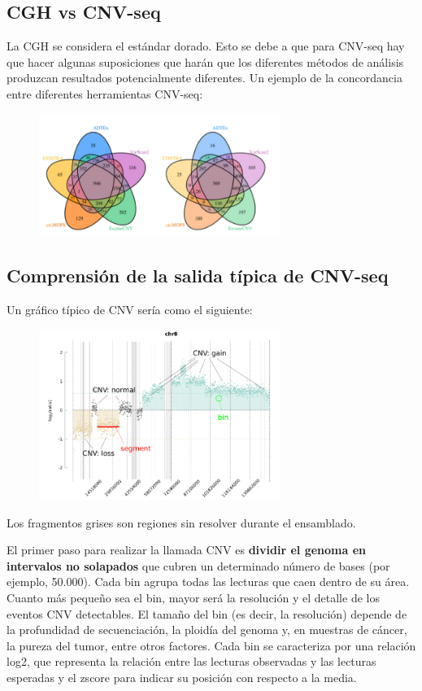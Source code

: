\begin{itemize}
\subsection{CGH vs CNV-seq}
La CGH se considera el estándar dorado. Esto se debe a que para CNV-seq hay que hacer algunas suposiciones que harán que los diferentes métodos de análisis produzcan resultados potencialmente diferentes. Un ejemplo de la concordancia entre diferentes herramientas CNV-seq:

\begin{figure}[h!]
\centering
\includegraphics[width = 0.7\textwidth]{figs/cgh-vs-cnvseq.png}
\end{figure}

\subsection{Comprensión de la salida típica de CNV-seq}
Un gráfico típico de CNV sería como el siguiente:

\begin{figure}[h!]
\centering
\includegraphics[width = 0.7\textwidth]{figs/cnv-plot.png}
\end{figure}
Los fragmentos grises son regiones sin resolver durante el ensamblado. 

El primer paso para realizar la llamada CNV es \textbf{dividir el genoma en intervalos no solapados} que cubren un determinado número de bases (por ejemplo, 50.000). Cada bin agrupa todas las lecturas que caen dentro de su área. Cuanto más pequeño sea el bin, mayor será la resolución y el detalle de los eventos CNV detectables.
El tamaño del bin (es decir, la resolución) depende de la profundidad de secuenciación, la ploidía del genoma y, en muestras de cáncer, la pureza del tumor, entre otros factores.
Cada bin se caracteriza por una relación log2, que representa la relación entre las lecturas observadas y las lecturas esperadas y el zscore para indicar su posición con respecto a la media.


\end{itemize}
